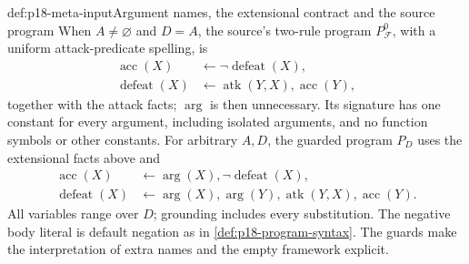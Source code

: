 \begin{hbdefinition}{def:p18-meta-input}{Argument names, the extensional contract and the source program}
When \(A\ne\varnothing\) and \(D=A\), the source's two-rule
program \(P^0_{\mathcal F}\), with a uniform attack-predicate spelling, is
\[
\begin{aligned}
 \operatorname{acc}(X)&\leftarrow\neg\operatorname{defeat}(X),\\
 \operatorname{defeat}(X)&\leftarrow
                    \operatorname{atk}(Y,X),\operatorname{acc}(Y),
\end{aligned}
\]
together with the attack facts; \(\operatorname{arg}\) is then
unnecessary. Its signature has one constant for every argument,
including isolated arguments, and no function symbols or other
constants. For arbitrary \(A,D\), the guarded program \(P_D\)
uses the extensional facts above and
\[
\begin{aligned}
 \operatorname{acc}(X)&\leftarrow
                \operatorname{arg}(X),\neg\operatorname{defeat}(X),\\
 \operatorname{defeat}(X)&\leftarrow
                \operatorname{arg}(X),\operatorname{arg}(Y),
                \operatorname{atk}(Y,X),\operatorname{acc}(Y).
\end{aligned}
\]
All variables range over \(D\); grounding includes every substitution.
The negative body literal is default negation as in
\cref{def:p18-program-syntax}. The guards make the interpretation
of extra names and the empty framework explicit.
\end{hbdefinition}

